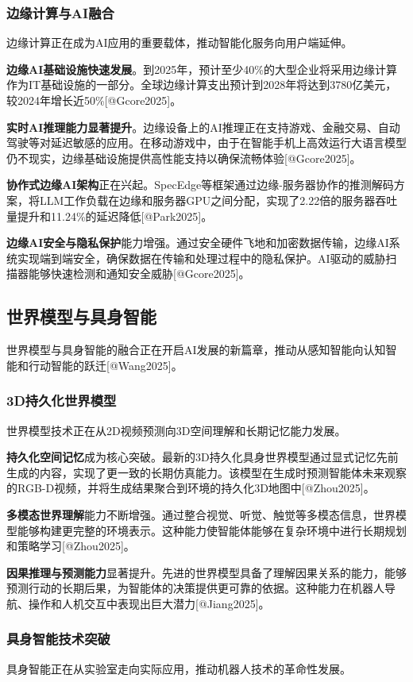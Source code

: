 \documentclass{article}
\begin{document}
\subsubsection{边缘计算与AI融合}
边缘计算正在成为AI应用的重要载体，推动智能化服务向用户端延伸。

\textbf{边缘AI基础设施快速发展}。到2025年，预计至少40\%的大型企业将采用边缘计算作为IT基础设施的一部分。全球边缘计算支出预计到2028年将达到3780亿美元，较2024年增长近50\%[@Gcore2025]。

\textbf{实时AI推理能力显著提升}。边缘设备上的AI推理正在支持游戏、金融交易、自动驾驶等对延迟敏感的应用。在移动游戏中，由于在智能手机上高效运行大语言模型仍不现实，边缘基础设施提供高性能支持以确保流畅体验[@Gcore2025]。

\textbf{协作式边缘AI架构}正在兴起。SpecEdge等框架通过边缘-服务器协作的推测解码方案，将LLM工作负载在边缘和服务器GPU之间分配，实现了2.22倍的服务器吞吐量提升和11.24\%的延迟降低[@Park2025]。

\textbf{边缘AI安全与隐私保护}能力增强。通过安全硬件飞地和加密数据传输，边缘AI系统实现端到端安全，确保数据在传输和处理过程中的隐私保护。AI驱动的威胁扫描器能够快速检测和通知安全威胁[@Gcore2025]。

\subsection{世界模型与具身智能}
世界模型与具身智能的融合正在开启AI发展的新篇章，推动从感知智能向认知智能和行动智能的跃迁[@Wang2025]。

\subsubsection{3D持久化世界模型}
世界模型技术正在从2D视频预测向3D空间理解和长期记忆能力发展。

\textbf{持久化空间记忆}成为核心突破。最新的3D持久化具身世界模型通过显式记忆先前生成的内容，实现了更一致的长期仿真能力。该模型在生成时预测智能体未来观察的RGB-D视频，并将生成结果聚合到环境的持久化3D地图中[@Zhou2025]。

\textbf{多模态世界理解}能力不断增强。通过整合视觉、听觉、触觉等多模态信息，世界模型能够构建更完整的环境表示。这种能力使智能体能够在复杂环境中进行长期规划和策略学习[@Zhou2025]。

\textbf{因果推理与预测能力}显著提升。先进的世界模型具备了理解因果关系的能力，能够预测行动的长期后果，为智能体的决策提供更可靠的依据。这种能力在机器人导航、操作和人机交互中表现出巨大潜力[@Jiang2025]。

\subsubsection{具身智能技术突破}
具身智能正在从实验室走向实际应用，推动机器人技术的革命性发展。
\end{document}

